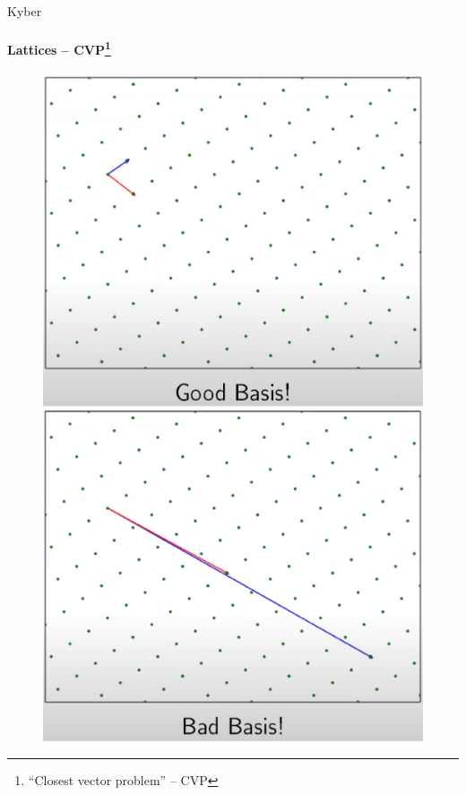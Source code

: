 \documentclass{rosenpass-beamer}
\let\say\enquote
\begin{document}
\begin{frame}{Kyber}
  \framesubtitle{Lattices -- CVP\footnote{\say{Closest vector problem} -- CVP}}

\begin{figure}
  \begin{minipage}{.45\textwidth}
    \centering
    \includegraphics[width=\textwidth]{assets/lattice-good.png}
  \end{minipage}\hfill
  \begin{minipage}{.45\textwidth}
    \centering
    \includegraphics[width=\textwidth]{assets/lattice-bad.png}
  \end{minipage}
\end{figure}
\end{frame}
\end{document}
